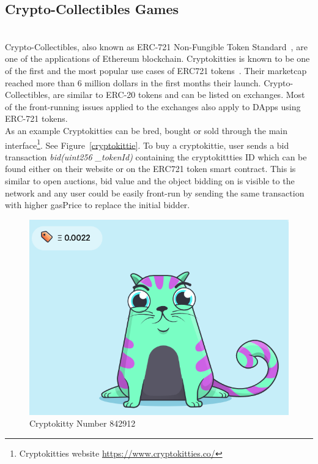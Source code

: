 


\subsection{Crypto-Collectibles Games} \hfill\\ 

Crypto-Collectibles, also known as ERC-721 Non-Fungible Token Standard~\cite{erc721}, are one of the applications of Ethereum blockchain. Cryptokitties is known to be one of the first and the most popular use cases of ERC721 tokens~\cite{cryptokitties}. Their marketcap reached more than 6 million dollars in the first months their launch. Crypto-Collectibles, are similar to ERC-20 tokens and can be listed on exchanges. Most of the front-running issues applied to the exchanges also apply to DApps using ERC-721 tokens. \\

As an example Cryptokitties can be bred, bought or sold through the main interface\footnote{Cryptokitties website \url{https://www.cryptokitties.co/}}. See Figure~\ref{cryptokittie}.
To buy a cryptokittie, user sends a bid transaction \textit{bid(uint256 \_tokenId)} containing the cryptokittties ID which can be found either on their website or on the ERC721 token smart contract. This is similar to open auctions, bid value and the object bidding on is visible to the network and any user could be easily front-run by sending the same transaction with higher gasPrice to replace the initial bidder. 


\begin{figure}[h]
\centering
\includegraphics[width=0.4\linewidth]{figures/cryptokittie842912.png}
\caption{ Cryptokitty Number 842912 \label{fig:cryptokittie}}
\end{figure}


